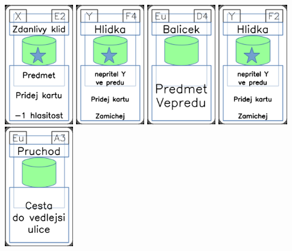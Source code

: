 \documentclass[a4paper]{article}
\begin{document}
	\includegraphics[width=3.0cm]{img-5_21}
	\includegraphics[width=3.0cm]{img-5_28}
	\includegraphics[width=3.0cm]{img-4_18}
	\includegraphics[width=3.0cm]{img-5_26}
	\includegraphics[width=3.0cm]{img-4_32}
\end{document}
